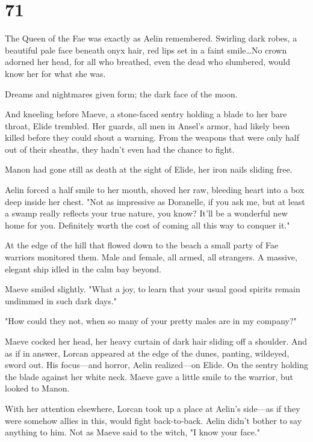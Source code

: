 
\chapter{71}

The Queen of the Fae was exactly as Aelin remembered.
Swirling dark robes, a beautiful pale face beneath onyx hair, red lips set in a faint smile\ldots No crown adorned her head, for all who breathed, even the dead who slumbered, would know her for what she was.

Dreams and nightmares given form; the dark face of the moon.

And kneeling before Maeve, a stone-faced sentry holding a blade to her bare throat, Elide trembled.
Her guards, all men in Ansel's armor, had likely been killed before they could shout a warning.
From the weapons that were only half out of their sheaths, they hadn't even had the chance to fight.

Manon had gone still as death at the sight of Elide, her iron nails sliding free.

Aelin forced a half smile to her mouth, shoved her raw, bleeding heart into a box deep inside her chest.
"Not as impressive as Doranelle, if you ask me, but at least a swamp really reflects your true nature, you know?
It'll be a wonderful new home for you.
Definitely worth the cost of coming all this way to conquer it."

At the edge of the hill that flowed down to the beach a small party of Fae warriors monitored them.
Male and female, all armed, all strangers.
A massive, elegant ship idled in the calm bay beyond.

Maeve smiled slightly.
"What a joy, to learn that your usual good spirits remain undimmed in such dark days."

"How could they not, when so many of your pretty males are in my company?"

Maeve cocked her head, her heavy curtain of dark hair sliding off a shoulder.
And as if in answer, Lorcan appeared at the edge of the dunes, panting, wildeyed, sword out.
His focus---and horror, Aelin realized---on Elide.
On the sentry holding the blade against her white neck.
Maeve gave a little smile to the warrior, but looked to Manon.

With her attention elsewhere, Lorcan took up a place at Aelin's side---as if they were somehow allies in this, would fight back-to-back.
Aelin didn't bother to say anything to him.
Not as Maeve said to the witch, "I know your face."

